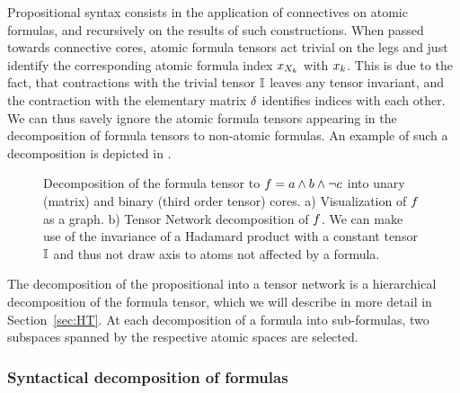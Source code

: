Propositional syntax consists in the application of connectives on atomic formulas, and recursively on the results of such constructions.
When passed towards connective cores, atomic formula tensors act trivial on the legs and just identify the corresponding atomic formula index $x_{X_{k}}$ with $x_{k}$.
This is due to the fact, that contractions with the trivial tensor $\mathbb{I}$ leaves any tensor invariant, and the contraction with the elementary matrix $\delta$ identifies indices with each other.
We can thus savely ignore the atomic formula tensors appearing in the decomposition of formula tensors to non-atomic formulas.
An example of such a decomposition is depicted in .

\begin{figure}[h]
\begin{center}
	
\end{center}
\caption{Decomposition of the formula tensor to $f = a \land b \land \lnot c$ into unary (matrix) and binary (third order tensor) cores.
	a) Visualization of $f$ as a graph. %
	b) Tensor Network decomposition of $f$.
	We can make use of the invariance of a Hadamard product with a constant tensor $\mathbb{I}$ and thus not draw axis to atoms not affected by a formula.}
\label{fig:decompositionExample}
\end{figure}

\begin{remark}
	The decomposition of the propositional into a tensor network is a hierarchical decomposition of the formula tensor, which we will describe in more detail in Section~\ref{sec:HT}.
	At each decomposition of a formula into sub-formulas, two subspaces spanned by the respective atomic spaces are selected. 
\end{remark}


\subsubsection{Syntactical decomposition of formulas}\label{sec:termClauseDecomposition}

